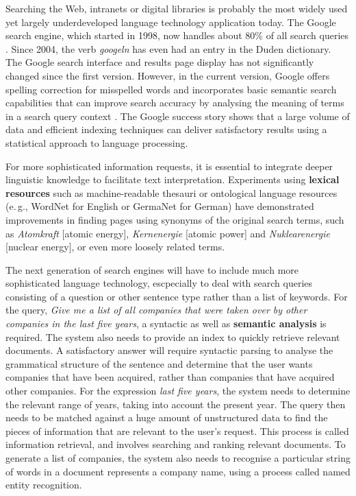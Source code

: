 \documentclass[]{../../metanetpaper}
\begin{document}
\begin{multicols}{2}
Searching the Web, intranets or digital libraries is probably the most widely used yet largely underdeveloped language technology application today. The Google search engine, which started in 1998, now handles about 80\% of all search queries \cite{spi1}. Since 2004, the verb \textit{googeln} has even had an entry in the Duden dictionary. The Google search interface and results page display has not significantly changed since the first version. However, in the current version, Google offers spelling correction for misspelled words and incorporates basic semantic search capabilities that can improve search accuracy by analysing the meaning of terms in a search query context \cite{pc1}. The Google success story shows that a large volume of data and efficient indexing techniques can deliver satisfactory results using a statistical approach to language processing. 

For more sophisticated information requests, it is essential to integrate deeper linguistic knowledge to facilitate text interpretation. Experiments using \textbf{lexical resources} such as machine-readable thesauri or ontological language resources (e.\,g., WordNet for English or GermaNet for German) have demonstrated improvements in finding pages using synonyms of the original search terms, such as \textit{Atomkraft} {[}atomic energy{]}, \textit{Kernenergie} {[}atomic power{]} and \textit{Nuklearenergie} {[}nuclear energy{]}, or even more loosely related terms.


The next generation of search engines will have to include much more sophisticated language technology, escpecially to deal with search queries consisting of a question or other sentence type rather than a list of keywords. For the query, \textit{Give me a list of all companies that were taken over by other companies in the last five years}, a syntactic as well as \textbf{semantic analysis} is required. The system also needs to provide an index to quickly retrieve relevant documents. A satisfactory answer will require syntactic parsing to analyse the grammatical structure of the sentence and determine that the user wants companies that have been acquired, rather than companies that have acquired other companies. For the expression \textit{last five years}, the system needs to determine the relevant range of years, taking into account the present year. The query then needs to be matched against a huge amount of unstructured data to find the pieces of information that are relevant to the user’s request. This process is called information retrieval, and involves searching and ranking relevant documents. To generate a list of companies, the system also needs to recognise a particular string of words in a document represents a company name, using a process called named entity recognition.


\end{multicols}
\end{document}
